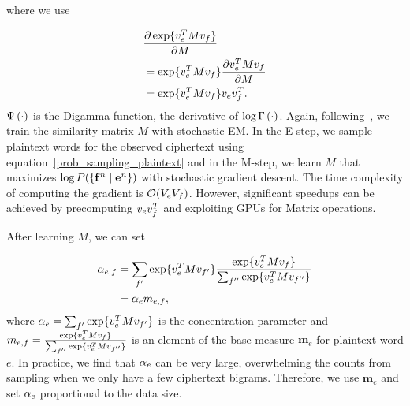 where we use 

\begin{align}
& \frac{\partial  \exp \{ v_{e}^ T M  v_{f} \} }{\partial M} \notag \\
& = \exp \{ v_{e}^ T M  v_{f} \} \frac{\partial  v_{e}^T M  v_{f} }{\partial M} \notag \\
& = \exp \{ v_{e}^ T M  v_{f} \} v_{e} v_{f}^T \notag.
\end{align}
$\Psi \left( \cdot \right)$ is the Digamma function, the derivative of $\log \Gamma \left( \cdot \right)$. Again, following~, we train the similarity matrix $M$ with stochastic EM. In the E-step, we sample plaintext words for the observed ciphertext using equation~\ref{prob_sampling_plaintext} and in the M-step, we learn $M$ that maximizes $\log P( \{ \mathbf{f}^n \mid \mathbf{e}^n \})$ with stochastic gradient descent. The time complexity of computing the gradient is $\mathcal{O}(V_{e}V_{f})$. However, significant speedups can be achieved by precomputing $v_{e}v_{f}^T$ and exploiting GPUs for Matrix operations. 

After learning $M$, we can set 

\begin{align}
\alpha_{e,f} &= \sum_{f'} \exp \{ v_{e}^T  M  v_{f'} \} \frac{\exp \{ v_{e}^T  M  v_{f} \}} {\sum_{f''} \exp \{ v_{e}^T  M  v_{f''} \} } \notag \\
                                    & = \alpha_{e} m_{e,f} \label{base-concentration}, 
\end{align}
where $\alpha_{e} = \sum_{f'} \exp \{ v_{e}^T  M  v_{f'} \} $ is the concentration parameter and $m_{e,f} = \frac{\exp \{ v_{e}^T  M  v_{f} \}} {\sum_{f''} \exp \{ v_{e}^T  M  v_{f''} \} } $ is an element of the base measure $\mathbf{m}_e$ for plaintext word $e$. In practice, we find that $\alpha_{e}$ can be very large, overwhelming the counts from sampling when we only have a few ciphertext bigrams. Therefore, we use $\mathbf{m}_e$ and set $\alpha_{e}$ proportional to the data size. 

\iffalse
we will first derive the complete data log-likelihood for our model and then present the steps of our stochastic EM algorithm. For a particular ciphertext and plaintext bigram, For an english word $\word{e}$, 

We adopt the approach based on word context similarities to learn a better base distribution. However, our work is different from previous approach in the following ways: First, our work does not rely on any seed lexicon to learn the mapping between word context vectors, rather, it uses the results from sampling. Second, the mapping is not always fixed, but becomes better as the sampling process progresses. Last, but not least, the base distribution derived from the mapping and word contexts is used to improve decipherment.
\fi